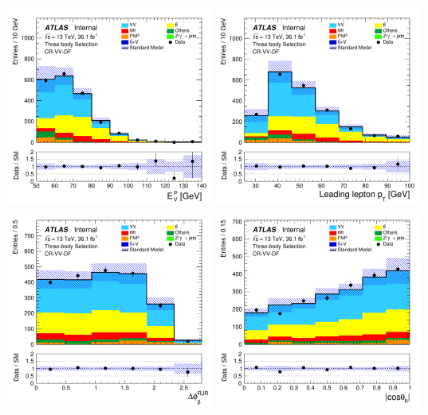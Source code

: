 \begin{figure}[!htb]
    \begin{center}
        \includegraphics[width=0.48\textwidth]{figures/search_stop2l/bkg_est/crvdf/crv_MDR}
        \includegraphics[width=0.48\textwidth]{figures/search_stop2l/bkg_est/crvdf/crv_l_pt0}
        \includegraphics[width=0.48\textwidth]{figures/search_stop2l/bkg_est/crvdf/crv_DPB_vSS}
        \includegraphics[width=0.48\textwidth]{figures/search_stop2l/bkg_est/crvdf/crv_cosThetaB}

\end{center}
\end{figure}
